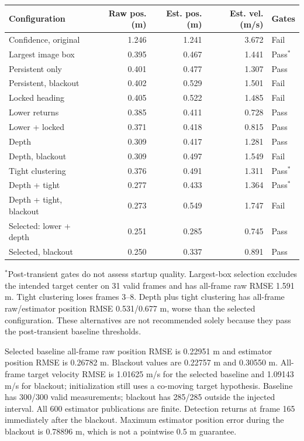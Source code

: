 \documentclass[11pt]{article}
\begin{document}
\begin{center}
\small
\begin{tabular}{lrrrl}
\toprule
Configuration & Raw pos. (m) & Est. pos. (m) & Est. vel. (m/s) & Gates \\
\midrule
Confidence, original & 1.246 & 1.241 & 3.672 & Fail \\
Largest image box & 0.395 & 0.467 & 1.441 & Pass$^*$ \\
Persistent only & 0.401 & 0.477 & 1.307 & Pass \\
Persistent, blackout & 0.402 & 0.529 & 1.501 & Fail \\
Locked heading & 0.405 & 0.522 & 1.485 & Fail \\
Lower returns & 0.385 & 0.411 & 0.728 & Pass \\
Lower + locked & 0.371 & 0.418 & 0.815 & Pass \\
Depth & 0.309 & 0.417 & 1.281 & Pass \\
Depth, blackout & 0.309 & 0.497 & 1.549 & Fail \\
Tight clustering & 0.376 & 0.491 & 1.311 & Pass$^*$ \\
Depth + tight & 0.277 & 0.433 & 1.364 & Pass$^*$ \\
Depth + tight, blackout & 0.273 & 0.549 & 1.747 & Fail \\
Selected: lower + depth & 0.251 & 0.285 & 0.745 & Pass \\
Selected, blackout & 0.250 & 0.337 & 0.891 & Pass \\
\bottomrule
\end{tabular}
\end{center}
$^*$Post-transient gates do not assess startup quality. Largest-box selection
excludes the intended target center on 31 valid frames and has all-frame raw
RMSE 1.591 m. Tight clustering loses frames 3--8. Depth plus tight clustering
has all-frame raw/estimator position RMSE 0.531/0.677 m, worse than the
selected configuration. These alternatives are not recommended solely because
they pass the post-transient baseline thresholds.

Selected baseline all-frame raw position RMSE is 0.22951 m and estimator
position RMSE is 0.26782 m. Blackout values are 0.22757 m and 0.30550 m.
All-frame target velocity RMSE is 1.01625 m/s for the selected baseline and
1.09143 m/s for blackout; initialization still
uses a co-moving target hypothesis. Baseline has 300/300 valid measurements;
blackout has 285/285 outside the injected interval. All 600 estimator
publications are finite. Detection returns at frame 165 immediately after
the blackout. Maximum estimator position error during the blackout is
0.78896 m, which is not a pointwise 0.5 m guarantee.
\end{document}
